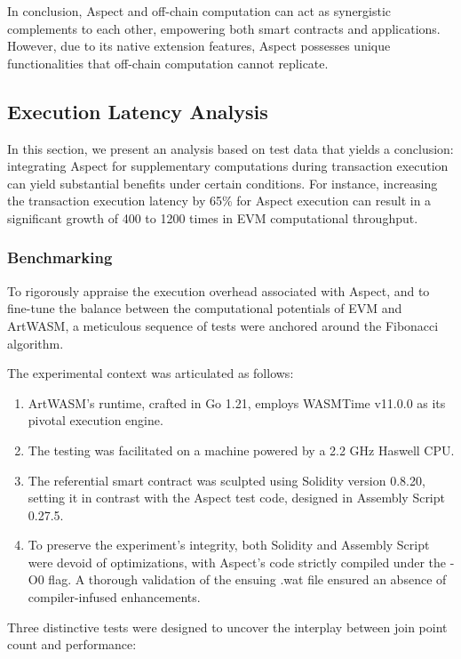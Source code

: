 In conclusion, Aspect and off-chain computation can act as synergistic complements to each other, empowering both smart contracts and applications. However, due to its native extension features, Aspect possesses unique functionalities that off-chain computation cannot replicate.

\subsection{Execution Latency Analysis}

In this section, we present an analysis based on test data that yields a conclusion: integrating Aspect for supplementary computations during transaction execution can yield substantial benefits under certain conditions. For instance, increasing the transaction execution latency by 65\% for Aspect execution can result in a significant growth of 400 to 1200 times in EVM computational throughput.

\subsubsection{Benchmarking}

To rigorously appraise the execution overhead associated with Aspect, and to fine-tune the balance between the computational potentials of EVM and ArtWASM, a meticulous sequence of tests were anchored around the Fibonacci algorithm.

The experimental context was articulated as follows:

\begin{enumerate}
  \item ArtWASM's runtime, crafted in Go 1.21, employs WASMTime v11.0.0 as its pivotal execution engine.
  \item The testing was facilitated on a machine powered by a 2.2 GHz Haswell CPU.
  \item The referential smart contract was sculpted using Solidity version 0.8.20, setting it in contrast with the Aspect test code, designed in Assembly Script 0.27.5.
  \item To preserve the experiment's integrity, both Solidity and Assembly Script were devoid of optimizations, with Aspect's code strictly compiled under the -O0 flag. A thorough validation of the ensuing .wat file ensured an absence of compiler-infused enhancements.
\end{enumerate}

Three distinctive tests were designed to uncover the interplay between join point count and performance:

